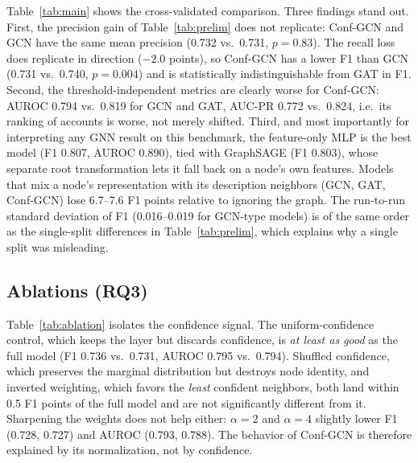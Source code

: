 \documentclass[conference]{IEEEtran}
\begin{document}
Table~\ref{tab:main} shows the cross-validated comparison. Three findings stand out. First, the precision gain of Table~\ref{tab:prelim} does not replicate: Conf-GCN and GCN have the same mean precision (0.732 vs.\ 0.731, $p=0.83$). The recall loss does replicate in direction ($-2.0$ points), so Conf-GCN has a lower F1 than GCN (0.731 vs.\ 0.740, $p=0.004$) and is statistically indistinguishable from GAT in F1. Second, the threshold-independent metrics are clearly worse for Conf-GCN: AUROC 0.794 vs.\ 0.819 for GCN and GAT, AUC-PR 0.772 vs.\ 0.824, i.e.\ its ranking of accounts is worse, not merely shifted. Third, and most importantly for interpreting any GNN result on this benchmark, the feature-only MLP is the best model (F1 0.807, AUROC 0.890), tied with GraphSAGE (F1 0.803), whose separate root transformation lets it fall back on a node's own features. Models that mix a node's representation with its description neighbors (GCN, GAT, Conf-GCN) lose 6.7--7.6 F1 points relative to ignoring the graph. The run-to-run standard deviation of F1 (0.016--0.019 for GCN-type models) is of the same order as the single-split differences in Table~\ref{tab:prelim}, which explains why a single split was misleading.

\subsection{Ablations (RQ3)}
\label{sec:results-abl}

\begin{table}[t]
\caption{Ablations, description graph (mean $\pm$ std over 25 runs). $p$: paired Wilcoxon of F1 vs.\ full Conf-GCN, Holm-corrected over the nine comparisons.}
\label{tab:ablation}
\centering
\scriptsize
\setlength{\tabcolsep}{2.5pt}
\end{table}

Table~\ref{tab:ablation} isolates the confidence signal. The uniform-confidence control, which keeps the layer but discards confidence, is \emph{at least as good} as the full model (F1 0.736 vs.\ 0.731, AUROC 0.795 vs.\ 0.794). Shuffled confidence, which preserves the marginal distribution but destroys node identity, and inverted weighting, which favors the \emph{least} confident neighbors, both land within 0.5 F1 points of the full model and are not significantly different from it. Sharpening the weights does not help either: $\alpha=2$ and $\alpha=4$ slightly lower F1 (0.728, 0.727) and AUROC (0.793, 0.788). The behavior of Conf-GCN is therefore explained by its normalization, not by confidence.
\end{document}
